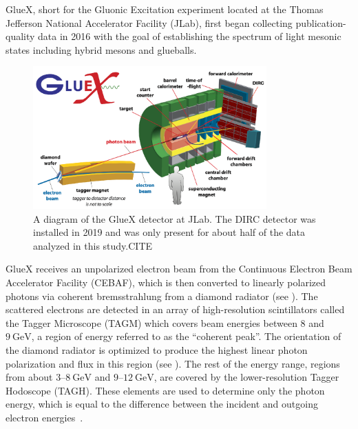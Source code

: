 GlueX, short for the Gluonic Excitation experiment located at the Thomas Jefferson National Accelerator Facility (JLab), first began collecting publication-quality data in 2016 with the goal of establishing the spectrum of light mesonic states including hybrid mesons and glueballs.

\begin{figure}
  \begin{center}
    \includegraphics[width=0.8\textwidth]{figures/gluex_detector.png}
  \end{center}
  \caption{A diagram of the GlueX detector at JLab. The DIRC detector was installed in 2019 and was only present for about half of the data analyzed in this study.{\color{red}CITE}}\label{fig:gluex-detector}
\end{figure}

GlueX receives an unpolarized electron beam from the Continuous Electron Beam Accelerator Facility (CEBAF), which is then converted to linearly polarized photons via coherent bremsstrahlung from a diamond radiator (see ). The scattered electrons are detected in an array of high-resolution scintillators called the Tagger Microscope (TAGM) which covers beam energies between $8$ and $\SI{9}{\giga\eV}$, a region of energy referred to as the ``coherent peak''. The orientation of the diamond radiator is optimized to produce the highest linear photon polarization and flux in this region (see ). The rest of the energy range, regions from about $3$--$\SI{8}{\giga\eV}$ and $9$--$\SI{12}{\giga\eV}$, are covered by the lower-resolution Tagger Hodoscope (TAGH). These elements are used to determine only the photon energy, which is equal to the difference between the incident and outgoing electron energies~\cite{Adhikari2021}.



